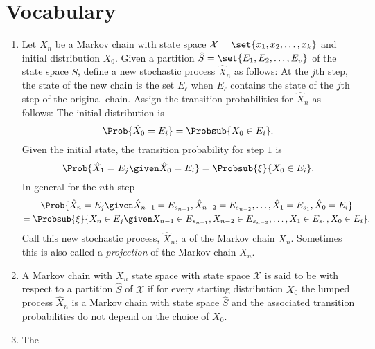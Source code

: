 \documentclass[12pt]{article}
\begin{document}
\section*{Vocabulary}
\begin{enumerate}
    \item
        Let \( X_n \) be a Markov chain with state space \( \mathcal{X}
        = \set{x_1, x_2, \dots, x_k} \) and initial distribution \( X_0 \).
        Given a partition \( \hat{S} = \set{E_1, E_2, \dots, E_v} \) of
        the state space \( S \), define a new stochastic process \( \hat
        {X}_n \) as follows:  At the \( j \)th step, the state of the
        new chain is the set \( E_\ell \) when \( E_\ell \) contains the
        state of the \( j \)th step of the original chain.  Assign the
        transition probabilities for \( \hat{X}_n \) as follows:  The
        initial distribution is
        \[
            \Prob{\hat{X}_0 = E_i} = \Probsub{X_0 \in E_i}.
        \] Given the initial state, the transition probability for step \(
        1 \) is
        \[
            \Prob{\hat{X}_1 = E_j \given \hat{X}_0 = E_i} = \Probsub{\xi}
            {X_0 \in E_i }.
        \] In general for the \( n \)th step
        \begin{multline*}
            \Prob{\hat{X}_n = E_j \given \hat{X}_{n-1} = E_{s_{n-1}},
            \hat{X}_{n-2} = E_{s_{n-2}}, \dots, \hat{X}_1 = E_{s_1},
            \hat{X}_0 = E_i} \\
            = \Probsub{\xi}{X_n \in E_j \given X_{n-1} \in E_{s_{n-1}},
            X_{n-2} \in E_{s_{n-2}}, \dots, X_1 \in E_{s_1}, X_0 \in E_i}.
        \end{multline*}
        Call this new stochastic process, \( \hat{X}_n \), a %
        of the Markov chain \( X_n \).  Sometimes this is also called a
        \emph{projection} of the Markov chain \( X_n \).
    \item
        A Markov chain with \( X_n \) state space with state space \(
        \mathcal{X} \) is said to be %
        with respect to a partition \( \hat{S} \) of \( \mathcal{X} \) if for
        every starting distribution \( X_0 \) the lumped process \( \hat
        {X}_n \) is a Markov chain with state space \( \hat{S} \) and the
        associated transition probabilities do not depend on the choice
        of \( X_0 \).
    \item
        The %

\end{enumerate}
\end{document}
